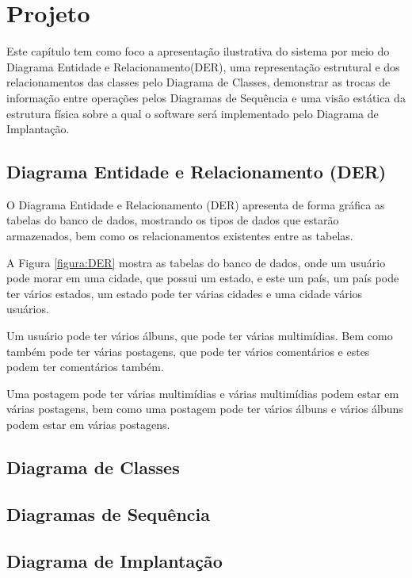 \chapter{Projeto}

Este capítulo tem como foco a apresentação ilustrativa do sistema por meio do Diagrama Entidade e Relacionamento(DER), uma representação estrutural e dos relacionamentos das classes pelo Diagrama de Classes, demonstrar as trocas de informação entre operações pelos Diagramas de Sequência e uma visão estática da estrutura física sobre a qual o software será implementado pelo Diagrama de Implantação.

\section{Diagrama Entidade e Relacionamento (DER)}

O Diagrama Entidade e Relacionamento (DER) apresenta de forma gráfica as tabelas do banco de dados, mostrando os tipos de dados que estarão armazenados, bem como os relacionamentos existentes entre as tabelas.

A Figura \ref{figura:DER} mostra as tabelas do banco de dados, onde um usuário pode morar em uma cidade, que possui um estado, e este um país, um país pode ter vários estados, um estado pode ter várias cidades e uma cidade vários usuários.

Um usuário pode ter vários álbuns, que pode ter várias multimídias. Bem como também pode ter várias postagens, que pode ter vários comentários e estes podem ter comentários também.

Uma postagem pode ter várias multimídias e várias multimídias podem estar em várias postagens, bem como uma postagem pode ter vários álbuns e vários álbuns podem estar em várias postagens.


\newpage

\section{Diagrama de Classes}


\newpage

\section{Diagramas de Sequência}

\section{Diagrama de Implantação}
